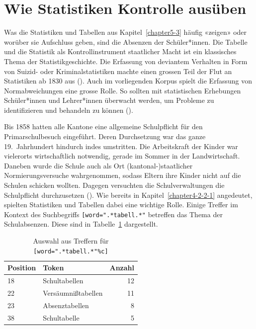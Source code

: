 \pagebreak

\section{Wie Statistiken Kontrolle ausüben}\label{chapter-5-4}

Was die Statistiken und Tabellen aus Kapitel~\ref{chapter5-3} häufig «zeigen» oder worüber sie Aufschluss geben, sind die Absenzen der Schüler*innen. Die Tabelle und die Statistik als Kontrollinstrument staatlicher Macht ist ein klassisches Thema der Statistikgeschichte. Die Erfassung von deviantem Verhalten in Form von Suizid- oder Kriminalstatistiken machte einen grossen Teil der Flut an Statistiken ab 1830 aus (\cite[30]{porter_rise_1986}). Auch im vorliegenden Korpus spielt die Erfassung von Normabweichungen eine grosse Rolle. So sollten mit statistischen Erhebungen Schüler*innen und Lehrer*innen überwacht werden, um Probleme zu identifizieren und behandeln zu können (\cite[217]{ruoss_zahlen_2018}).

Bis 1858 hatten alle Kantone eine allgemeine Schulpflicht für den Primarschulbesuch eingeführt. Deren Durchsetzung war das ganze 19.~Jahrhundert hindurch indes umstritten. Die Arbeitskraft der Kinder war vielerorts wirtschaftlich notwendig, gerade im Sommer in der Landwirtschaft. Daneben wurde die Schule auch als Ort (kantonal-)staatlicher Normierungsversuche wahrgenommen, sodass Eltern ihre Kinder nicht auf die Schulen schicken wollten. Dagegen versuchten die Schulverwaltungen die Schulpflicht durchzusetzen (\cite[26-27]{criblez_einleitung_1999}). Wie bereits in Kapitel~\ref{chapter4-2-2-1} angedeutet, spielten Statistiken und Tabellen dabei eine wichtige Rolle. Einige Treffer im Kontext des Suchbegriffs \texttt{[word\-=".*tabell.*"} betreffen das Thema der Schulabsenzen. Diese sind in Tabelle~\ref{table:5-3} dargestellt.

\hspace{1cm}

\renewcommand{\arraystretch}{1}{
\begin{table}[!ht]
    \centering
    \begin{tabular}{llr}
        \toprule
        \textbf{Position} & \textbf{Token} & \textbf{Anzahl} \\
        \midrule
        18 & Schultabellen & 12 \\ 
        22 & Versäumnißtabellen & 11 \\ 
        23 & Absenztabellen & 8 \\ 
        38 & Schultabelle & 5 \\ 
        \bottomrule
    \end{tabular}
    \caption{Auswahl aus Treffern für \texttt{[word=\-".*tabell.*"\%c]}}
\label{table:5-3}
\end{table}
}

